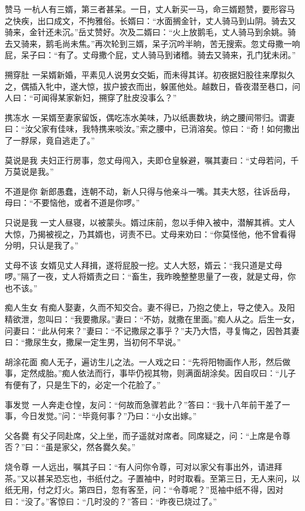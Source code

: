 \documentclass[12pt,UTF8]{ctexbook}
\begin{document}
赞马
一杭人有三婿，第三者甚呆。一日，丈人新买一马，命三婿题赞，要形容马之快疾，出口成文，不拘雅俗。长婿曰：“水面搁金针，丈人骑马到山阴。骑去又骑来，金针还未沉。”岳丈赞好。次及二婿曰：“火上放鹅毛，丈人骑马到余姚。骑去又骑来，鹅毛尚未焦。”再次轮到三婿，呆子沉吟半晌，苦无搜索。忽丈母撒一响屁，呆子曰：“有了。丈母撒个屁，丈人骑马到诸稽。骑去又骑来，孔门犹未闭。”

搠穿肚
一呆婿新婚，平素见人说男女交姤，而未得其详。初夜据妇股往来摩拟久之，偶插入牝中，遂大惊，拔户披衣而出，躲匿他处。越数日，昏夜潜至巷口，问人曰：“可闻得某家新妇，搠穿了肚皮没事么？”

携冻水
一呆婿至妻家留饭，偶吃冻水美味，乃以纸裹数块，纳之腰间带归。谓妻曰：“汝父家有佳味，我特携来啖汝。”索之腰中，已消溶矣。惊曰：“奇！如何撒出了一脬尿，竟自逃走了。”

莫说是我
夫妇正行房事，忽丈母闯入，夫即仓皇躲避，嘱其妻曰：“丈母若问，千万莫说是我。”

不道是你
新郎愚蠢，连朝不动，新人只得与他亲斗一嘴。其夫大怒，往诉岳母，母曰：“不要恼他，或者不道是你啰。”

只说是我
一丈人昼寝，以被蒙头。婿过床前，忽以手伸入被中，潜解其裤。丈人大惊，乃揭被视之，乃其婿也，诃责不已。丈母来劝曰：“你莫怪他，他不曾看得分明，只认是我了。”

丈母不该
女婿见丈人拜揖，遂将屁股一挖。丈人大怒，婿云：“我只道是丈母啰。”隔了一夜，丈人将婿责之曰：“畜生，我昨晚整整思量了一夜，就是丈母，你也不该。”

痴人生女
有痴人娶妻，久而不知交合。妻不得已，乃抱之使上，导之使入。及阳精欲泄，忽叫曰：“我要撒尿。”妻曰：“不妨，就撒在里面。”痴人从之。后生一女，问妻曰：“此从何来？”妻曰：“不记撒尿之事乎？”夫乃大悟，寻复悔之，因咎其妻曰：“撒尿生女，撒屎一定生男，当初何不早说。”

胡涂花面
痴人无子，遍访生儿之法。一人戏之曰：“先将阳物画作人形，然后做事，定然成胎。”痴人依法而行，事毕仍视其物，则满面胡涂矣。因自叹曰：“儿子有便有了，只是生下的，必定一个花脸了。”

事发觉
一人奔走仓惶，友问：“何故而急骤若此？”答曰：“我十八年前干差了一事，今日发觉。”问：“毕竟何事？”乃曰：“小女出嫁。”

父各爨
有父子同赴席，父上坐，而子遥就对席者。同席疑之，问：“上席是令尊否？”曰：“虽是家父，然各爨久矣。”

烧令尊
一人远出，嘱其子曰：“有人问你令尊，可对以家父有事出外，请进拜茶。”又以甚呆恐忘也，书纸付之。子置袖中，时时取看。至第三日，无人来问，以纸无用，付之灯火。第四日，忽有客至，问：“令尊呢？”觅袖中纸不得，因对曰：“没了。”客惊曰：“几时没的？”答曰：“昨夜已烧过了。”
\end{document}
